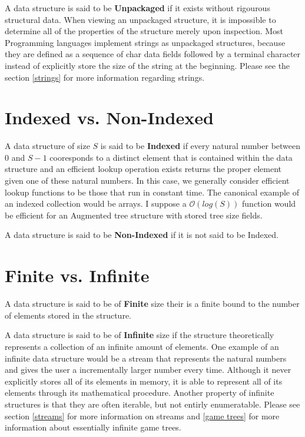 \documentclass[12pt, letterpaper]{book}
\newcommand{\bigO}{\mathcal{O}}
\begin{document}
A data structure is said to be \textbf{Unpackaged} if it exists without rigourous structural data. When viewing an unpackaged structure, it is impossible to determine all of the properties of the structure merely upon inspection. Most Programming languages implement strings as unpackaged structures, because they are defined as a sequence of char data fields followed by a terminal character instead of explicitly store the size of the string at the beginning. Please see the section \ref{strings} for more information regarding strings.

\section{Indexed vs. Non-Indexed}

A data structure of size $S$ is said to be \textbf{Indexed} if every natural number between 0 and $S-1$ cooresponds to a distinct element that is contained within the data structure and an efficient lookup operation exists returns the proper element given one of these natural numbers. In this case, we generally consider efficient lookup functions to be those that run in constant time. The canonical example of an indexed collection would be arrays. I suppose a $\bigO(log(S))$ function would be efficient for an Augmented tree structure with stored tree size fields.

A data structure is said to be \textbf{Non-Indexed} if it is not said to be Indexed.

\section{Finite vs. Infinite}

A data structure is said to be of \textbf{Finite} size their is a finite bound to the number of elements stored in the structure.

A data structure is said to be of \textbf{Infinite} size if the structure theoretically represents a collection of an infinite amount of elements. One example of an infinite data structure would be a stream that represents the natural numbers and gives the user a incrementally larger number every time. Although it never explicitly stores all of its elements in memory, it is able to represent all of its elements through its mathematical procedure. Another property of infinite structures is that they are often iterable, but not entirly enumeratable. Please see section \ref{streams} for more information on streams and \ref{game trees} for more information about essentially infinite game trees.
\end{document}
